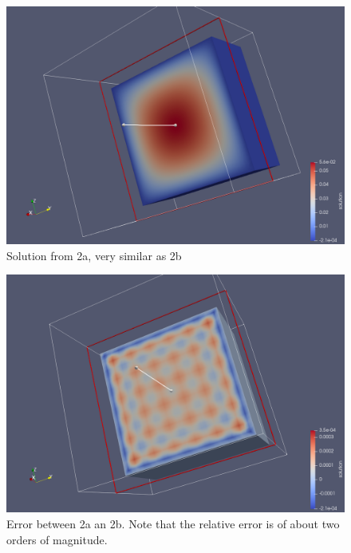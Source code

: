 \begin{figure}[H]
	\centering
	\includegraphics[width=\textwidth]{heatb.png} 
	\caption{Solution from 2a, very similar as 2b}
	\label{fig:heatb}
\end{figure}
\vfill
\begin{figure}[H]
	\centering
	\includegraphics[width=\textwidth]{error2b.png} 
	\caption{Error between 2a an 2b. Note that the relative error is of about two orders of magnitude.}
	\label{fig:error2b}
\end{figure}

